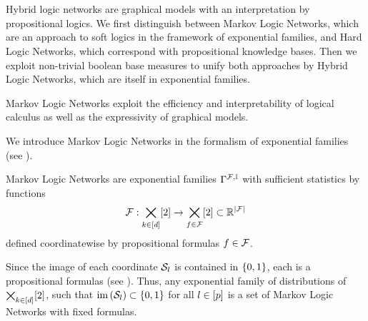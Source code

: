 \chapter{\chatextnetworkRepresentation}\label{cha:networkRepresentation}

Hybrid logic networks are graphical models with an interpretation by propositional logics.
We first distinguish between Markov Logic Networks, which are an approach to soft logics in the framework of exponential families, and Hard Logic Networks, which correspond with propositional knowledge bases.
Then we exploit non-trivial boolean base measures to unify both approaches by Hybrid Logic Networks, which are itself in exponential families.




Markov Logic Networks exploit the efficiency and interpretability of logical calculus as well as the expressivity of graphical models. 


We introduce Markov Logic Networks in the formalism of exponential families (see ).

\begin{definition}
	Markov Logic Networks are exponential families $\Gamma^{\mathcal{F},\mathbb{I}}$ with sufficient statistics by functions
		\[ \mathcal{F} : \bigtimes_{k\in[d]}[2] \rightarrow \bigtimes_{f\in\mathcal{F}}[2] \subset \mathbb{R}^{\left|\mathcal{F}\right|} \]
	defined coordinatewise by propositional formulas $f\in\mathcal{F}$.
\end{definition}

Since the image of each coordinate $\mathcal{S}_{l}$ is contained in $\{0,1\}$, each is a propositional formulas (see ).
Thus, any exponential family of distributions of $\bigtimes_{k\in[d]}[2]$, such that $\mathrm{im}\left(\mathcal{S}_{l}\right)\subset\{0,1\}$ for all $l\in[p]$ is a set of Markov Logic Networks with fixed formulas.

